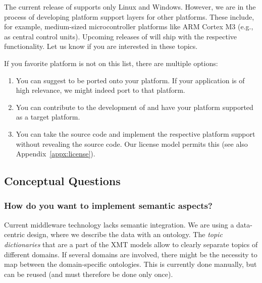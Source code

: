 The current release of \xme supports only Linux and Windows.
However, we are in the process of developing platform support layers for other platforms.
These include, for example, medium-sized microcontroller platforms like ARM Cortex M3 (e.g., as central control units).
Upcoming releases of \xme will ship with the respective functionality.
Let us know if you are interested in these topics.

If you favorite platform is not on this list, there are multiple options:
\begin{enumerate}
	\item You can suggest \xme to be ported onto your platform.
		If your application is of high relevance, we might indeed port \xme to that platform.
	
	\item You can contribute to the development of \xme and have your platform supported as a target platform.
	
	\item You can take the \xme source code and implement the respective platform support without revealing the source code.
		Our license model permits this (see also Appendix~\ref{appx:license}).
\end{enumerate}

\subsection{Conceptual Questions}

\subsubsection{How do you want to implement semantic aspects?}

Current middleware technology lacks semantic integration.
We are using a data-centric design, where we describe the data with an ontology.
The \emph{topic dictionaries} that are a part of the XMT models allow to clearly separate topics of different domains.
If several domains are involved, there might be the necessity to map between the domain-specific ontologies.
This is currently done manually, but can be reused (and must therefore be done only once).


